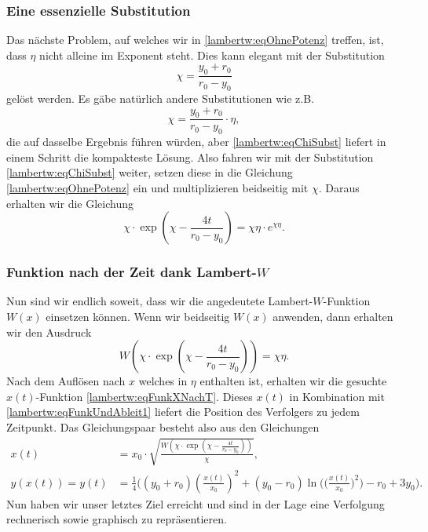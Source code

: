 \subsubsection{Eine essenzielle Substitution
	\label{lambertw:subsubsection:SubstChi}}
Das nächste Problem, auf welches wir in \eqref{lambertw:eqOhnePotenz} treffen, ist, dass \(\eta\) nicht alleine im Exponent steht. Dies kann elegant mit der Substitution 
\begin{equation}
	\chi
	=
	\frac{y_0+r_0}{r_0-y_0}
	\label{lambertw:eqChiSubst}
\end{equation}
gelöst werden.
Es gäbe natürlich andere Substitutionen wie z.B. 
\[\displaystyle \chi=\frac{y_0+r_0}{r_0-y_0}\cdot\eta,\] 
die auf dasselbe Ergebnis führen würden, aber \eqref{lambertw:eqChiSubst} liefert in einem Schritt die kompakteste Lösung. Also fahren wir mit der Substitution \eqref{lambertw:eqChiSubst} weiter, setzen diese in die Gleichung \eqref{lambertw:eqOhnePotenz} ein und multiplizieren beidseitig mit \(\chi\). Daraus erhalten wir die Gleichung
\begin{equation}
	\chi\cdot \operatorname{exp}\left(\displaystyle \chi-\frac{4t}{r_0-y_0}\right)
	=
	\chi\eta\cdot e^{\displaystyle \chi\eta}.
	\label{lambertw:eqNachSubst}
\end{equation}

\subsubsection{Funktion nach der Zeit dank Lambert-\(W\)
	\label{lambertw:subsubsection:LambertWundFvonT}}
Nun sind wir endlich soweit, dass wir die angedeutete Lambert-\(W\)-Funktion \(W(x)\) einsetzen können. Wenn wir beidseitig \(W(x)\) anwenden, dann erhalten wir den Ausdruck
\begin{equation}
	W\left(\chi\cdot \operatorname{exp}\left(\displaystyle \chi-\frac{4t}{r_0-y_0}\right)\right)
	=
	\chi\eta.
\end{equation}
Nach dem Auflösen nach \(x\) welches in \(\eta\) enthalten ist, erhalten wir die gesuchte \(x(t)\)-Funktion \eqref{lambertw:eqFunkXNachT}. Dieses \(x(t)\) in Kombination mit \eqref{lambertw:eqFunkUndAbleit1} liefert die Position des Verfolgers zu jedem Zeitpunkt. Das Gleichungspaar besteht also aus den Gleichungen
\begin{subequations}
	\label{lambertw:eqFunktionenNachT}
	\begin{align}
		\label{lambertw:eqFunkXNachT}
		x(t)
		&=
		x_0\cdot\sqrt{\frac{W\left(\chi\cdot \operatorname{exp}\left(\displaystyle \chi-\frac{4t}{r_0-y_0}\right)\right)}{\chi}}, \\
		\label{lambertw:eqFunkYNachT}
		y(x(t))
		=
		y(t)
		&=
		\frac{1}{4}\biggl(\left(y_0+r_0\right)\left(\frac{x(t)}{x_0}\right)^2+\left(y_0-r_0\right)\operatorname{ln}\biggl(\biggl(\frac{x(t)}{x_0}\biggr)^2\biggr)-r_0+3y_0\biggr).
	\end{align}
\end{subequations}
Nun haben wir unser letztes Ziel erreicht und sind in der Lage eine Verfolgung rechnerisch sowie graphisch zu repräsentieren.

